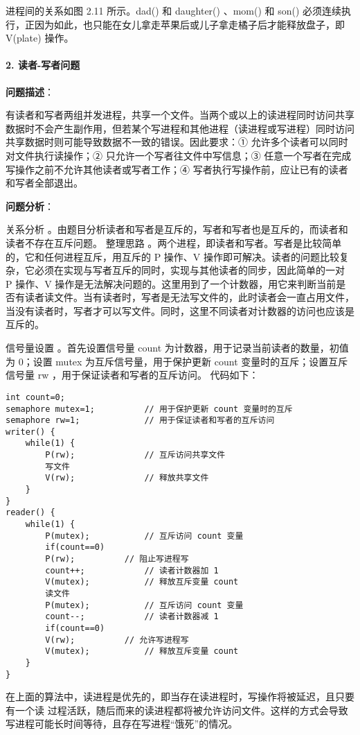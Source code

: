 \documentclass{ctexbook}
\begin{document}
进程间的关系如图 2.11 所示。dad() 和 daughter() 、mom() 和 son() 必须连续执行，正因为如此，也只能在女儿拿走苹果后或儿子拿走橘子后才能释放盘子，即 V(plate) 操作。

\paragraph{2. 读者-写者问题}

\textbf{问题描述}：

有读者和写者两组并发进程，共享一个文件。当两个或以上的读进程同时访问共享数据时不会产生副作用，但若某个写进程和其他进程（读进程或写进程）同时访问共享数据时则可能导致数据不一致的错误。因此要求：① 允许多个读者可以同时对文件执行读操作；② 只允许一个写者往文件中写信息；③ 任意一个写者在完成写操作之前不允许其他读者或写者工作；④ 写者执行写操作前，应让已有的读者和写者全部退出。

\textbf{问题分析}：

关系分析 。由题目分析读者和写者是互斥的，写者和写者也是互斥的，而读者和读者不存在互斥问题。
整理思路 。两个进程，即读者和写者。写者是比较简单的，它和任何进程互斥，用互斥的 P 操作、V 操作即可解决。读者的问题比较复杂，它必须在实现与写者互斥的同时，实现与其他读者的同步，因此简单的一对 P 操作、V 操作是无法解决问题的。这里用到了一个计数器，用它来判断当前是否有读者读文件。当有读者时，写者是无法写文件的，此时读者会一直占用文件，当没有读者时，写者才可以写文件。同时，这里不同读者对计数器的访问也应该是互斥的。

信号量设置 。首先设置信号量 count 为计数器，用于记录当前读者的数量，初值为 0；设置 mutex 为互斥信号量，用于保护更新 count 变量时的互斥；设置互斥信号量 rw ，用于保证读者和写者的互斥访问。
代码如下：

\begin{lstlisting}
int count=0;
semaphore mutex=1;          // 用于保护更新 count 变量时的互斥
semaphore rw=1;             // 用于保证读者和写者的互斥访问
writer() {
	while(1) {
		P(rw);              // 互斥访问共享文件
		写文件
		V(rw);              // 释放共享文件
	}
}
reader() {
	while(1) {
		P(mutex);           // 互斥访问 count 变量
		if(count==0)
		P(rw);          // 阻止写进程写
		count++;            // 读者计数器加 1
		V(mutex);           // 释放互斥变量 count
		读文件
		P(mutex);           // 互斥访问 count 变量
		count--;            // 读者计数器减 1
		if(count==0)
		V(rw);          // 允许写进程写
		V(mutex);           // 释放互斥变量 count
	}
}
\end{lstlisting}
在上面的算法中，读进程是优先的，即当存在读进程时，写操作将被延迟，且只要有一个读
过程活跃，随后而来的读进程都将被允许访问文件。这样的方式会导致写进程可能长时间等待，且存在写进程“饿死”的情况。
\end{document}

